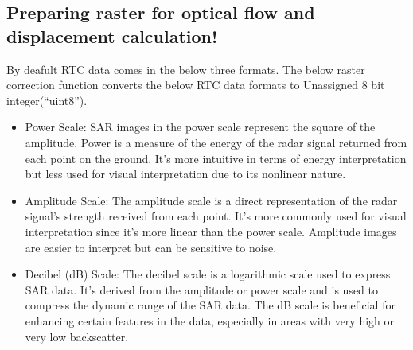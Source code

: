 \documentclass[letterpaper,10pt,english]{sphinxmanual}
\begin{document}
\subsection{Preparing raster for optical flow and displacement calculation!}
\label{\detokenize{notebooks/RockGlacier_radar:Preparing-raster-for-optical-flow-and-displacement-calculation!}}
\sphinxAtStartPar
By deafult RTC data comes in the below three formats. The below raster correction function converts the below RTC data formats to Unassigned 8 bit integer(“uint8”).
\begin{itemize}
\item {} 
\sphinxAtStartPar
Power Scale: SAR images in the power scale represent the square of the amplitude. Power is a measure of the energy of the radar signal returned from each point on the ground. It’s more intuitive in terms of energy interpretation but less used for visual interpretation due to its non\sphinxhyphen{}linear nature.

\item {} 
\sphinxAtStartPar
Amplitude Scale: The amplitude scale is a direct representation of the radar signal’s strength received from each point. It’s more commonly used for visual interpretation since it’s more linear than the power scale. Amplitude images are easier to interpret but can be sensitive to noise.

\item {} 
\sphinxAtStartPar
Decibel (dB) Scale: The decibel scale is a logarithmic scale used to express SAR data. It’s derived from the amplitude or power scale and is used to compress the dynamic range of the SAR data. The dB scale is beneficial for enhancing certain features in the data, especially in areas with very high or very low backscatter.

\end{itemize}
\end{document}
